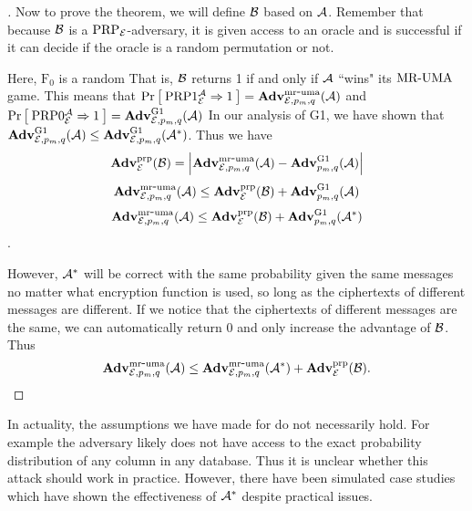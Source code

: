 \begin{proof}[]
Now to prove the theorem, we will define ${\mathcal B}$ based on ${\mathcal A}$. Remember that because ${\mathcal B}$ is a $\textnormal{PRP}_{\cal E}$-adversary, it is given access to an oracle and is successful if it can decide if the oracle is a random permutation or not.
\begin{figure}[H]
\centering
{}
\end{figure}

Here, $\textrm{F}_0$ is a random That is, ${\mathcal B}$ returns 1 if and only if ${\mathcal A}$ ``wins" its $\textnormal{MR-UMA}$ game. This means that $\Pr\left[\: \textnormal{PRP}1_{\cal E}^{\mathcal A}\Rightarrow 1 \:\right]= \mathbf{Adv}^{\mathrm{mr\mbox{-} uma}}_{{\cal E},p_m,q}({\mathcal A})$ and
$\Pr\left[\: \textnormal{PRP}0_{\cal E}^{\mathcal A}\Rightarrow1 \:\right]=\mathbf{Adv}^{\textrm{G1}}_{{\cal E},p_m,q}({\mathcal A})$
In our analysis of G1, we have shown that $\mathbf{Adv}^{\textrm{G1}}_{{\cal E},p_m,q}({\mathcal A})\leq\mathbf{Adv}^{\textrm{G1}}_{{\cal E},p_m,q}({\mathcal A}^*)$. Thus we have $$\mathbf{Adv}^{\mathrm{prp}}_{{\cal E}}({\mathcal B})=\left| \mathbf{Adv}^{\mathrm{mr\mbox{-} uma}}_{{\cal E},p_m,q}({\mathcal A})-\mathbf{Adv}^{\textrm{G1}}_{p_m,q}({\mathcal A}) \right|$$
$$\mathbf{Adv}^{\mathrm{mr\mbox{-} uma}}_{{\cal E},p_m,q}({\mathcal A})\leq\mathbf{Adv}^{\mathrm{prp}}_{{\cal E}}({\mathcal B})+\mathbf{Adv}^{\textrm{G1}}_{p_m,q}({\mathcal A}) $$
$$\mathbf{Adv}^{\mathrm{mr\mbox{-} uma}}_{{\cal E},p_m,q}({\mathcal A})\leq\mathbf{Adv}^{\mathrm{prp}}_{{\cal E}}({\mathcal B})+\mathbf{Adv}^{\textrm{G1}}_{p_m,q}({\mathcal A}^*) $$.

However, ${\mathcal A}^*$ will be correct with the same probability given the same messages no matter what encryption function is used, so long as the ciphertexts of different messages are different. If we notice that the ciphertexts of different messages are the same, we can automatically return 0 and only increase the advantage of ${\mathcal B}$. Thus 
$$ \mathbf{Adv}^{\mathrm{mr\mbox{-} uma}}_{{\cal E},p_m,q}({\mathcal A}) \le 
        \mathbf{Adv}^{\mathrm{mr\mbox{-} uma}}_{{\cal E},p_m,q}({\mathcal A}^*) + \mathbf{Adv}^{\mathrm{prp}}_{{\cal E}}({\mathcal B}).$$
\qedsym
\end{proof}


In actuality, the assumptions we have made for  do not necessarily hold. For example the adversary likely does not have access to the exact probability distribution of any column in any database. Thus it is unclear whether this attack should work in practice. However, there have been simulated case studies which have shown the effectiveness of ${\mathcal A}^*$ despite practical issues.

